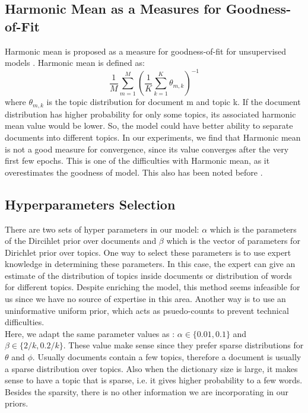 \documentclass[twoside,12pt]{article}
\begin{document}
\subsection{Harmonic Mean  as a Measures for Goodness-of-Fit}
Harmonic mean is proposed as a measure for goodness-of-fit for unsupervised models \cite{harmonic}. Harmonic mean is defined as:
\begin{equation}
\frac{1}{M}\sum_{m=1}^{M}(\frac{1}{K}\sum_{k=1}^{K}\theta_{m,k})^{-1}
\end{equation}
where $\theta_{m,k}$ is the topic distribution for document m and topic k. If the document distribution has higher probability for only some topics, its associated harmonic mean value would be lower. So, the model could have better ability to separate documents into different topics. In our experiments, we find that Harmonic mean is not a good measure for convergence, since its value converges after the very first few epochs. This is one of the difficulties with Harmonic mean, as it overestimates the goodness of model. This also has been noted before \cite{wallach}.


\subsection{Hyperparameters Selection}
There are two sets of hyper parameters in our model: $\alpha$ which is the parameters of the Dircihlet prior over documents and $\beta$ which is the vector of parameters for Dirichlet prior over topics. One way to select these parameters is to use expert knowledge in determining these parameters. In this case, the expert can give an estimate of the distribution of topics inside documents or distribution of words for different topics. Despite enriching the model, this method seems infeasible for us since we have no source of expertise in this area. Another way is to use an uninformative uniform prior, which acts as psuedo-counts to prevent technical difficulties.\\
Here, we adapt the same parameter values as \cite{fastlda}: $\alpha \in \{0.01,0.1\}$ and $\beta\in\{2/k,0.2/k\}$. These value make sense since they prefer sparse distributions for $\theta$ and $\phi$. Usually documents contain a few topics, therefore a document is usually a sparse distribution over topics. Also when the dictionary size is large, it makes sense to have a topic that is sparse, i.e. it gives higher probability to a few words. Besides the sparsity, there is no other information we are incorporating in our priors. 
\end{document}
